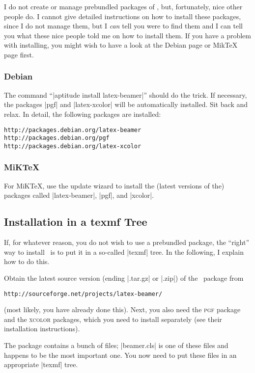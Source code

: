 I do not create or manage prebundled packages of \beamer, but,
fortunately, nice other people do. I cannot give detailed instructions
on how to install these packages, since I do not manage them, but I
\emph{can} tell you were to find them and I can tell you what these
nice people told me on how to install them. If you have a problem with
installing, you might wish to have a look at the Debian page or MikTeX
page first.


\subsubsection{Debian}

The command ``|aptitude install latex-beamer|'' should do the
trick. If necessary, the packages |pgf| and |latex-xcolor| will be
automatically installed. Sit back and relax. In detail, the following
packages are installed: 
\begin{verbatim}
http://packages.debian.org/latex-beamer
http://packages.debian.org/pgf
http://packages.debian.org/latex-xcolor
\end{verbatim}


\subsubsection{MiKTeX}

For MiK\TeX, use the update wizard to install the (latest versions of
the) packages called |latex-beamer|, |pgf|, and |xcolor|. 




\subsection{Installation in a texmf Tree}

If, for whatever reason, you do not wish to use a prebundled package,
the ``right'' way to install \beamer\ is to put it in a so-called
|texmf| tree. In the following, I explain how to do this.

Obtain the latest source version (ending |.tar.gz| or |.zip|) of the \beamer\
package from
\begin{verbatim}
http://sourceforge.net/projects/latex-beamer/
\end{verbatim}
(most likely, you have already done this). Next, you also need the
\textsc{pgf} package and the \textsc{xcolor} packages, 
which you need to install separately (see their installation
instructions). 

The package contains a bunch of files; |beamer.cls| is one of
these files and happens to be the most important one. You now need to
put these files in an appropriate |texmf| tree. 

